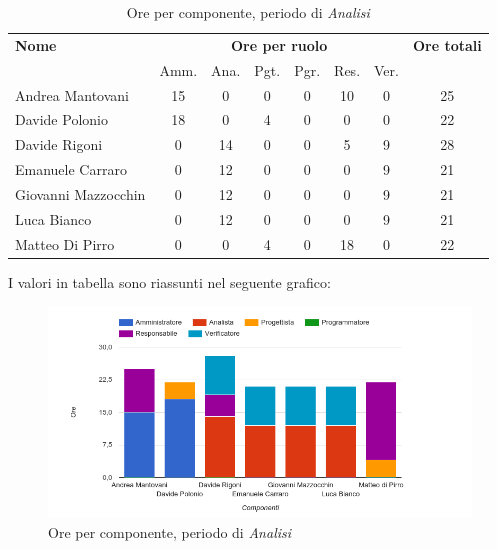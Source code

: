 \begin{table}[H]
\begin{tabular}{lccccccc}
\toprule
    \textbf{Nome}  & \multicolumn{6}{c}{\textbf{Ore per ruolo}} & \textbf{Ore totali} \\
     & Amm. & Ana. & Pgt. & Pgr. & Res. & Ver. & \\
    \midrule
    
	   Andrea Mantovani & 15 & 0 & 0 & 0 & 10 & 0 & 25 \\
	     Davide Polonio & 18 & 0 & 4 & 0 & 0 & 0 & 22 \\
	      Davide Rigoni & 0 & 14 & 0 & 0 & 5 & 9 & 28 \\
	   Emanuele Carraro & 0 & 12 & 0 & 0 & 0 & 9 & 21 \\
	Giovanni Mazzocchin & 0 & 12 & 0 & 0 & 0 & 9 & 21 \\
	        Luca Bianco & 0 & 12 & 0 & 0 & 0 & 9 & 21 \\
	    Matteo Di Pirro & 0 & 0 & 4 & 0 & 18 & 0 & 22 \\
    
    \bottomrule
\end{tabular}
\caption{Ore per componente, periodo di \textit{Analisi}}
\end{table}


I valori in tabella sono riassunti nel seguente grafico: \\ 

    \begin{figure}[H]
      \begin{center}
        \includegraphics[width=15cm]{res/img/suddivisioneRuoloProspettoOrario/orePerComponenteAnalisi.png}
      \caption{Ore per componente, periodo di \textit{Analisi}}
      \end{center} 
    \end{figure}    
    

